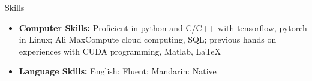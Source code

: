 \documentclass[a4paper,8pt,oneside]{scrartcl}
\newenvironment{ressection}[1]{
    \vspace{2pt}
    {\selectfont#1}
    \begin{itemize}
    \vspace{0pt}
}{
    \end{itemize}
}
\newcommand{\resitem}[1]{
    \vspace{-4pt}
    \item #1
}
\begin{document}
\begin{ressection}{Skills}
    \resitem{\textbf{Computer Skills:} Proficient in python and C/C++ with tensorflow, pytorch in Linux; Ali MaxCompute cloud computing, SQL; previous hands on experiences with CUDA programming, Matlab, \LaTeX{}}
    \resitem{\textbf{Language Skills:} English: Fluent; Mandarin: Native}
    
\end{ressection}

\vspace{2pt}

\end{document}
